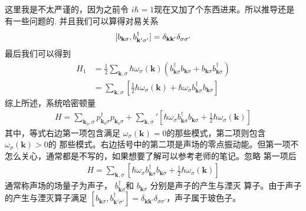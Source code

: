 这里我是不太严谨的，因为之前令 $ i\hbar =1$现在又加了个东西进来。所以推导还是有一些问题的.
并且我们可以算得对易关系
\begin{equation}
    \begin{aligned} 
    \relax [b_{\mathbf{k}\sigma },b^\dagger_{\mathbf{k'}\sigma '}] = \delta_{\mathbf{kk'} }\delta_{\sigma \sigma'}
    \end{aligned} 
\end{equation}
最后我们可以得到
\begin{equation}
    \begin{aligned} 
    H_1 &= \frac{1}{2}\sum_{\mathbf{k},\sigma} \hbar \omega_\sigma(\mathbf{k} ) (b^\dagger_{\mathbf{k}\sigma }b_{\mathbf{k}\sigma } 
    + b_{\mathbf{k}\sigma }b^\dagger_{\mathbf{k}\sigma }) \\
    &=\sum_{\mathbf{k},\sigma} [\frac{1}{2} \hbar \omega_\sigma (\mathbf{k} ) + \hbar \omega_\sigma b^\dagger_{\mathbf{k}\sigma }b_{\mathbf{k}\sigma }]
    \end{aligned} 
\end{equation}
综上所述，系统哈密顿量
\begin{equation}
    \begin{aligned} 
    H = \sum_{\mathbf{k}_0,\sigma }p^\dagger_{\mathbf{k}_0\sigma }p_{\mathbf{k}_0\sigma } + 
    \sum_{\mathbf{k},\sigma}' [ \hbar \omega_\sigma b^\dagger_{\mathbf{k}\sigma }b_{\mathbf{k}\sigma } +\frac{1}{2} \hbar \omega_\sigma (\mathbf{k} )]
    \end{aligned} 
\end{equation}
其中，等式右边第一项包含满足 $\omega_\sigma (\mathbf{k} ) = 0$的那些模式，第二项则包含 $\omega_\sigma (\mathbf{k} ) >0$的
那些模式。右边括号中的第二项是声场的零点振动能。但第一项不怎么关心，通常都是不写的，如果想要了解可以参考老师的笔记。忽略
第一项后
\begin{equation}
    \begin{aligned} 
        H = 
        \sum_{\mathbf{k},\sigma} [ \hbar \omega_\sigma b^\dagger_{\mathbf{k}\sigma }b_{\mathbf{k}\sigma } +\frac{1}{2} \hbar \omega_\sigma (\mathbf{k} )]
    \end{aligned} 
\end{equation}
通常称声场的场量子为声子， $b^\dagger_{\mathbf{k}\sigma }$和 $ b_{\mathbf{k}\sigma } $ 分别是声子的产生与湮灭
算子。由于声子的产生与湮灭算子满足 $[b_{\mathbf{k}\sigma },b^\dagger_{\mathbf{k'}\sigma '}] = \delta_{\mathbf{kk'} }\delta_{\sigma \sigma'}
$，声子属于玻色子。

